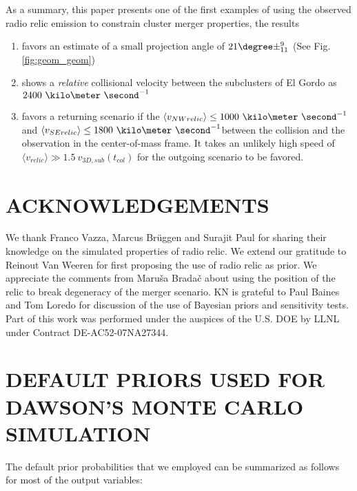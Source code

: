 As a summary, this paper presents one of the first examples of using the
observed radio relic emission to constrain cluster merger properties, the
results
\begin{enumerate}
	\item favors an estimate of a small projection angle of $21 \degree
		\pm^{9}_{11}$ (See	Fig. \ref{fig:geom_geom})\\ 
\item 
	shows a {\it relative} collisional velocity between the subclusters of El
	Gordo as $2400~\kilo\meter~\second^{-1}$ \\ 
\item favors a returning scenario if the $\langle v_{NW relic}\rangle \leq
	1000~\kilo
	\meter~\second^{-1}$ and $\langle v_{SE relic}\rangle \leq
	1800~\kilo\meter~\second^{-1}$between the collision and the observation in the
	center-of-mass frame. It takes
	an unlikely high speed of $\langle v_{relic} \rangle \gg 1.5~v_{3D,
	sub}(t_{col})$ for the outgoing scenario to be favored.  
\end{enumerate}

\section{ACKNOWLEDGEMENTS}
We thank Franco Vazza, Marcus Br\"{u}ggen and Surajit Paul for sharing
their knowledge on the simulated properties of radio relic. We
extend our gratitude to Reinout Van Weeren for first proposing the use of
radio relic as prior. We appreciate the comments from Maru\v{s}a
Brada\v{c} about using the position of the relic to break degeneracy
of the merger scenario. KN is grateful to Paul Baines and Tom Loredo for
discussion of the use of Bayesian priors and sensitivity tests. 
Part of this work was performed under the auspices of the U.S. DOE by LLNL under Contract DE-AC52-07NA27344.
%
%



\appendix

\section{DEFAULT PRIORS USED FOR DAWSON'S MONTE CARLO SIMULATION}
\label{app:priors}
%
The default prior probabilities that we employed can be summarized as
follows for most of the output variables: 

